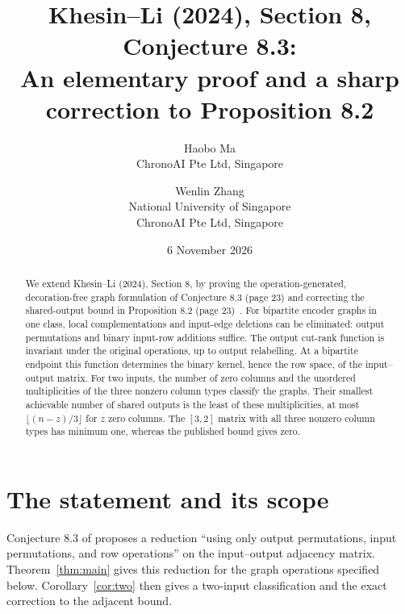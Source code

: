 \documentclass[11pt]{article}
\title{Khesin--Li (2024), Section 8, Conjecture 8.3:\\
An elementary proof and a sharp correction to Proposition 8.2}
\author{Haobo Ma\\\small ChronoAI Pte Ltd, Singapore
\and Wenlin Zhang\\\small National University of Singapore\\\small ChronoAI Pte Ltd, Singapore}
\date{6 November 2026}
\begin{document}
\maketitle
\begin{abstract}
We extend Khesin--Li (2024), Section 8, by proving the operation-generated,
decoration-free graph formulation of Conjecture 8.3 (page 23) and correcting
the shared-output bound in Proposition 8.2 (page 23)~\cite{KL}.
For bipartite encoder graphs in one class, local complementations and
input-edge deletions can be eliminated: output permutations and binary
input-row additions suffice. The output cut-rank function is invariant
under the original operations, up to output relabelling. At a bipartite
endpoint this function determines the binary kernel, hence the row space,
of the input--output matrix. For two inputs, the number of zero columns
and the unordered multiplicities of the three nonzero column types
classify the graphs. Their smallest achievable number of shared outputs
is the least of these multiplicities, at most $\lfloor(n-z)/3\rfloor$
for $z$ zero columns. The $[3,2]$ matrix with all three nonzero column
types has minimum one, whereas the published bound gives zero.
\end{abstract}

\section{The statement and its scope}
Conjecture 8.3 of \cite[Section 8, p.~23]{KL} proposes a reduction
``using only output permutations, input permutations, and row operations''
on the input--output adjacency matrix. Theorem~\ref{thm:main} gives this reduction for the
graph operations specified below. Corollary~\ref{cor:two} then gives a
two-input classification and the exact correction to the adjacent bound.
\end{document}
